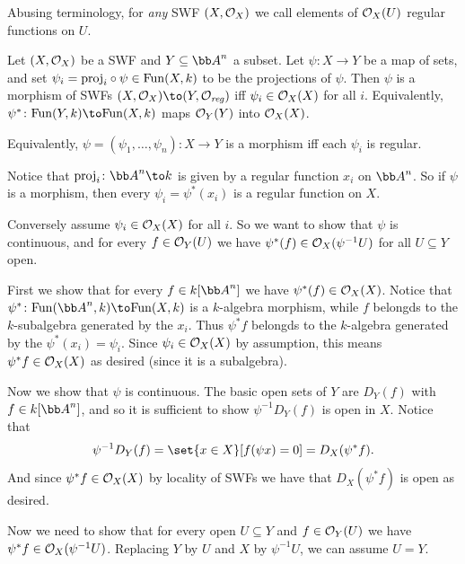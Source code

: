 \bnote

    Abusing terminology, for {\it any\/} SWF $(X,{{\cal O}}_X)$ we call elements of ${{\cal O}}_X(U)$ {\emphcolor regular functions} on $U$.

\enote


\bthrm

    Let $(X,{{\cal O}}_X)$ be a SWF and $Y\subseteq\bA^n$ a subset.
    Let $\psi\colon X\to Y$ be a map of sets, and set $\psi_i={\rm proj}_i\circ\psi\in{\rm Fun}(X,k)$ to be the projections of $\psi$.
    Then $\psi$ is a morphism of SWFs $(X,\O_X)\to(Y,\O_\reg)$ iff $\psi_i\in{{\cal O}}_X(X)$ for all $i$.
    Equivalently, $\psi^*\colon\fun(Y,k)\to\fun(X,k)$ maps ${{\cal O}}_Y(Y)$ into ${{\cal O}}_X(X)$.

\ethrm

\bnote

    Equivalently, $\psi=(\psi_1,\dots,\psi_n)\colon X\to Y$ is a morphism iff each $\psi_i$ is regular.

\enote

\bproof

    Notice that $\proj_i\colon\bA^n\to k$ is given by a regular function $x_i$ on $\bA^n$.
    So if $\psi$ is a morphism, then every $\psi_i=\psi^*(x_i)$ is a regular function on $X$.

    Conversely assume $\psi_i\in{{\cal O}}_X(X)$ for all $i$.
    So we want to show that $\psi$ is continuous, and for every $f\in{{\cal O}}_Y(U)$ we have $\psi^*(f)\in{{\cal O}}_X(\psi^{-1}U)$ for all $U\subseteq Y$
    open.

    First we show that for every $f\in k[\bA^n]$ we have $\psi^*(f)\in{{\cal O}}_X(X)$.
    Notice that $\psi^*\colon\fun(\bA^n,k)\to\fun(X,k)$ is a $k$-algebra morphism, while $f$ belongds to the $k$-subalgebra
    generated by the $x_i$.
    Thus $\psi^*f$ belongds to the $k$-algebra generated by the $\psi^*(x_i)=\psi_i$.
    Since $\psi_i\in{{\cal O}}_X(X)$ by assumption, this means $\psi^*f\in{{\cal O}}_X(X)$ as desired (since it is a subalgebra).

    Now we show that $\psi$ is continuous.
    The basic open sets of $Y$ are $D_Y(f)$ with $f\in k[\bA^n]$, and so it is sufficient to show $\psi^{-1}D_Y(f)$ is open in $X$.
    Notice that
    $$ \psi^{-1}D_Y(f) = \set{x\in X}[f(\psi x)=0] = D_X(\psi^*f) . $$
    And since $\psi^*f\in{{\cal O}}_X(X)$ by locality of SWFs we have that $D_X(\psi^*f)$ is open as desired.

    Now we need to show that for every open $U\subseteq Y$ and $f\in{{\cal O}}_Y(U)$ we have $\psi^*f\in{{\cal O}}_X(\psi^{-1}U)$.
    Replacing $Y$ by $U$ and $X$ by $\psi^{-1}U$, we can assume $U=Y$.

